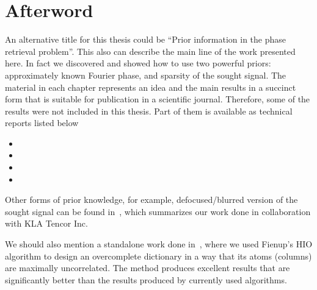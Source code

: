 
\chapter{Afterword}
\label{cha:afterword}

An alternative title for this thesis could be ``Prior information in
the phase retrieval problem''. This also can describe the main line of
the work presented here. In fact we discovered and showed how to use
two powerful priors: approximately known Fourier phase, and sparsity
of the sought signal. The material in each chapter represents
an idea and the main results in a succinct form that is suitable for 
publication in a scientific journal. Therefore, some of the
results were not included in this thesis. Part of them is available as
technical reports listed below
\begin{itemize}
\item {}
\item {}
\item {}
\item {}
\end{itemize}

Other forms of prior knowledge, for example, defocused/blurred version of the
sought signal can be found in~, which
summarizes our work done in  collaboration with KLA Tencor Inc. 

We should also mention a standalone work done
in~, where we used Fienup's HIO
algorithm to design an overcomplete dictionary in a way that its atoms
(columns) are maximally uncorrelated. The method produces excellent
results that are significantly better than the results produced by
currently used algorithms.


